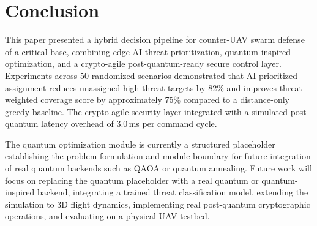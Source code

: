 \documentclass[12pt, a4paper]{article}
\begin{document}
\section{Conclusion}

This paper presented a hybrid decision pipeline for counter-UAV swarm defense of a critical base, combining edge AI threat prioritization, quantum-inspired optimization, and a crypto-agile post-quantum-ready secure control layer. Experiments across 50 randomized scenarios demonstrated that AI-prioritized assignment reduces unassigned high-threat targets by 82\% and improves threat-weighted coverage score by approximately 75\% compared to a distance-only greedy baseline. The crypto-agile security layer integrated with a simulated post-quantum latency overhead of 3.0\,ms per command cycle.

The quantum optimization module is currently a structured placeholder establishing the problem formulation and module boundary for future integration of real quantum backends such as QAOA or quantum annealing. Future work will focus on replacing the quantum placeholder with a real quantum or quantum-inspired backend, integrating a trained threat classification model, extending the simulation to 3D flight dynamics, implementing real post-quantum cryptographic operations, and evaluating on a physical UAV testbed.



\end{document}

